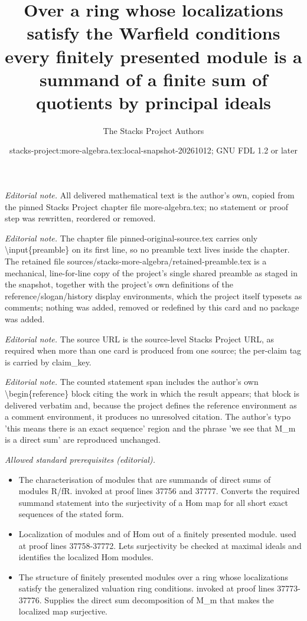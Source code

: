 \documentclass[10pt,a4paper]{amsart}
\title{Over a ring whose localizations satisfy the Warfield conditions every finitely presented module is a summand of a finite sum of quotients by principal ideals}
\author{The Stacks Project Authors}
\date{stacks-project:more-algebra.tex:local-snapshot-20261012; GNU FDL 1.2 or later}
\theoremstyle{plain}
\theoremstyle{definition}
\theoremstyle{remark}
\numberwithin{equation}{subsection}
\begin{document}
\maketitle
\setcounter{subsection}{1}
\noindent\textit{Editorial note.} All delivered mathematical text is the author's own, copied from the pinned Stacks Project chapter file more-algebra.tex; no statement or proof step was rewritten, reordered or removed.\par\medskip
\noindent\textit{Editorial note.} The chapter file pinned-original-source.tex carries only \textbackslash{}input\{preamble\} on its first line, so no preamble text lives inside the chapter. The retained file sources/stacks-more-algebra/retained-preamble.tex is a mechanical, line-for-line copy of the project's single shared preamble as staged in the snapshot, together with the project's own definitions of the reference/slogan/history display environments, which the project itself typesets as comments; nothing was added, removed or redefined by this card and no package was added.\par\medskip
\noindent\textit{Editorial note.} The source URL is the source-level Stacks Project URL, as required when more than one card is produced from one source; the per-claim tag is carried by claim\_key.\par\medskip
\noindent\textit{Editorial note.} The counted statement span includes the author's own \textbackslash{}begin\{reference\} block citing the work in which the result appears; that block is delivered verbatim and, because the project defines the reference environment as a comment environment, it produces no unresolved citation. The author's typo 'this means there is an exact sequence' region and the phrase 'we see that M\_m is a direct sum' are reproduced unchanged.\par\medskip
\noindent\textit{Allowed standard prerequisites (editorial).}\begin{itemize}
\item The characterisation of modules that are summands of direct sums of modules R/fR. invoked at proof lines 37756 and 37777. Converts the required summand statement into the surjectivity of a Hom map for all short exact sequences of the stated form.
\item Localization of modules and of Hom out of a finitely presented module. used at proof lines 37758-37772. Lets surjectivity be checked at maximal ideals and identifies the localized Hom modules.
\item The structure of finitely presented modules over a ring whose localizations satisfy the generalized valuation ring conditions. invoked at proof lines 37773-37776. Supplies the direct sum decomposition of M\_m that makes the localized map surjective.
\end{itemize}\medskip
\end{document}
